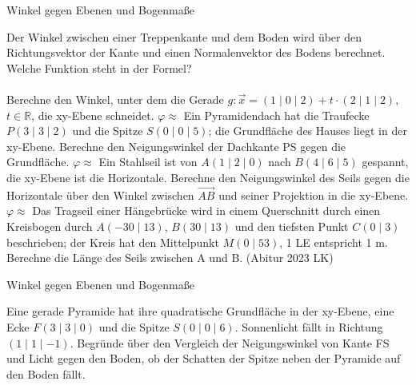\setcounter{aufgabe}{15}

\begin{aufgabe}{Winkel gegen Ebenen und Bogenmaße}
\begin{teile}
\teil Der Winkel zwischen einer Treppenkante und dem Boden wird über den Richtungsvektor der Kante und einen Normalenvektor des Bodens berechnet. Welche Funktion steht in der Formel? \\  \\ 
\teil Berechne den Winkel, unter dem die Gerade $g\colon \vec x = (1 \mid 0 \mid 2) + t \cdot (2 \mid 1 \mid 2)$, $t \in \mathbb{R}$, die xy-Ebene schneidet. $\varphi \approx$ \leerfeld[$^\circ$]
\teil Ein Pyramidendach hat die Traufecke $P(3 \mid 3 \mid 2)$ und die Spitze $S(0 \mid 0 \mid 5)$; die Grundfläche des Hauses liegt in der xy-Ebene. Berechne den Neigungswinkel der Dachkante PS gegen die Grundfläche. $\varphi \approx$ \leerfeld[$^\circ$]
\teil Ein Stahlseil ist von $A(1 \mid 2 \mid 0)$ nach $B(4 \mid 6 \mid 5)$ gespannt, die xy-Ebene ist die Horizontale. Berechne den Neigungswinkel des Seils gegen die Horizontale über den Winkel zwischen $\overrightarrow{AB}$ und seiner Projektion in die xy-Ebene. $\varphi \approx$ \leerfeld[$^\circ$]
\teil Das Tragseil einer Hängebrücke wird in einem Querschnitt durch einen Kreisbogen durch $A(-30 \mid 13)$, $B(30 \mid 13)$ und den tiefsten Punkt $C(0 \mid 3)$ beschrieben; der Kreis hat den Mittelpunkt $M(0 \mid 53)$, 1 LE entspricht 1 m. Berechne die Länge des Seils zwischen A und B. \hfill (Abitur 2023 LK)
\end{teile}
\end{aufgabe}

\begin{aufgabe}{Winkel gegen Ebenen und Bogenmaße}
\begin{teile}
\teil Eine gerade Pyramide hat ihre quadratische Grundfläche in der xy-Ebene, eine Ecke $F(3 \mid 3 \mid 0)$ und die Spitze $S(0 \mid 0 \mid 6)$. Sonnenlicht fällt in Richtung $(1 \mid 1 \mid -1)$. Begründe über den Vergleich der Neigungswinkel von Kante FS und Licht gegen den Boden, ob der Schatten der Spitze neben der Pyramide auf den Boden fällt.
\end{teile}
\end{aufgabe}

